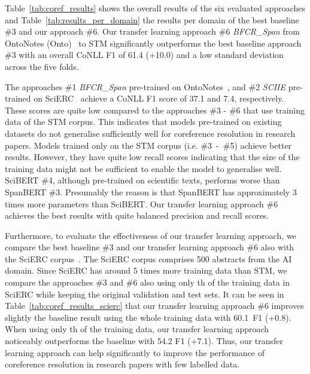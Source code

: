\documentclass[runningheads]{llncs}
\begin{document}
Table~\ref{tab:coref_results} shows the overall results of the six evaluated approaches and Table~\ref{tab:results_per_domain} the results per domain of the best baseline \#3 and our approach \#6. Our transfer learning approach \#6 \emph{BFCR\_Span} from OntoNotes (Onto)~\cite{Pradhan2013TowardsRL} to STM significantly outperforms the best baseline approach \#3 with an overall CoNLL F1 of 61.4 (+10.0) and a low standard deviation  across the five folds.

The approaches \#1 \emph{BFCR\_Span} pre-trained on OntoNotes~\cite{Pradhan2013TowardsRL}, and \#2 \emph{SCIIE} pre-trained on SciERC~\cite{Luan2018MultiTaskIO} achieve a CoNLL F1 score of 37.1 and 7.4, respectively. These scores are quite low compared to the approaches \#3 - \#6 that use training data of the STM corpus. 
This indicates that models pre-trained on existing datasets do not generalise sufficiently well for coreference resolution in research papers.
Models trained only on the STM corpus (i.e. \#3~-~\#5) achieve better results. However, they have quite low recall scores indicating that the size of the training data might not be sufficient to enable the model to generalise well. 
SciBERT \#4, although pre-trained on scientific texts, performs worse than SpanBERT \#3. Presumably the reason is that SpanBERT has approximately 3 times more parameters than SciBERT.
Our transfer learning approach \#6 achieves the best results with quite balanced precision and recall scores.

Furthermore, to evaluate the effectiveness of our transfer learning approach, we compare the best baseline \#3  and our transfer learning approach \#6 also with the SciERC corpus~\cite{Luan2018MultiTaskIO}. The SciERC corpus comprises 500 abstracts from the AI domain.
Since SciERC has around 5 times more training data than STM, we compare the approaches \#3 and \#6 also using only th of the training data in SciERC while keeping the original validation and test sets.
It can be seen in Table~\ref{tab:coref_results_scierc} that our transfer learning approach \#6 improves slightly the baseline result using the whole training data with 60.1~F1 (+0.8).
When using only th of the training data, our transfer learning approach noticeably outperforms the baseline with 54.2 F1 (+7.1).
Thus, our transfer learning approach can help significantly to improve the performance of coreference resolution in research papers with few labelled data.
\end{document}
